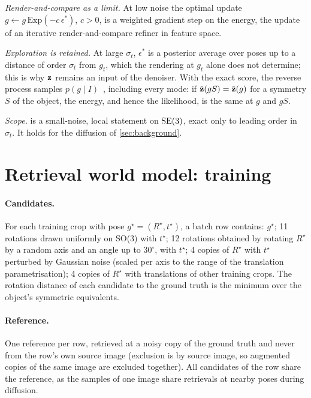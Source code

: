 \emph{Render-and-compare as a limit.} At low noise the optimal update $g\leftarrow g\,\mathrm{Exp}(-c\,\epsilon^\ast)$, $c>0$, is a
weighted gradient step on the energy, the update of an iterative render-and-compare refiner in feature space.

\emph{Exploration is retained.} At large $\sigma_t$, $\epsilon^\ast$ is a posterior average over poses up to a distance of order
$\sigma_t$ from $g_t$, which the rendering at $g_t$ alone does not determine; this is why $\mathbf{z}$ remains an input of the denoiser.
With the exact score, the reverse process samples $p(g\mid I)$~\cite{song2021sde,debortoli2022rsgm}, including every mode: if
$\hat{\mathbf{z}}(gS)=\hat{\mathbf{z}}(g)$ for a symmetry $S$ of the object, the energy, and hence the likelihood, is the same at $g$ and $gS$.

\emph{Scope.}  is a small-noise, local statement on $\mathrm{SE}(3)$, exact only to leading order in $\sigma_t$. It holds for the
diffusion of \cref{sec:background}.

\section{Retrieval world model: training}
\label{sec:supp-wm}

\paragraph{Candidates.}
For each training crop with pose $g^\star=(R^\star,t^\star)$, a batch row contains: $g^\star$; 11 rotations drawn uniformly on SO(3) with
$t^\star$; 12 rotations obtained by rotating $R^\star$ by a random axis and an angle up to $30^\circ$, with $t^\star$; 4 copies of $R^\star$ with
$t^\star$ perturbed by Gaussian noise (scaled per axis to the range of the translation parametrisation); 4 copies of $R^\star$ with
translations of other training crops. The rotation distance of each candidate to the ground truth is the minimum over the object's
symmetric equivalents.

\paragraph{Reference.}
One reference per row, retrieved at a noisy copy of the ground truth and never from the row's own source image (exclusion is by source
image, so augmented copies of the same image are excluded together). All candidates of the row share the reference, as the samples of
one image share retrievals at nearby poses during diffusion.

